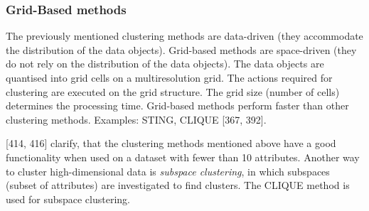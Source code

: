 



 

\subsubsection{Grid-Based methods}
The previously mentioned clustering methods are data-driven (they accommodate the distribution of the data objects). Grid-based methods are space-driven (they do not rely on the distribution of the data objects). The data objects are quantised into grid cells on a multiresolution grid. The actions required for clustering are executed on the grid structure. The grid size (number of cells) determines the processing time. Grid-based methods perform faster than other clustering methods. Examples: STING, CLIQUE \autocite{han2011data}[367, 392].

  

\vspace{5mm} %
\textcite{han2011data}[414, 416] clarify, that the clustering methods mentioned above have a good functionality when used on a dataset with fewer than 10 attributes. Another way to cluster high-dimensional data is \textit{subspace clustering}, in which subspaces (subset of attributes) are investigated to find clusters. The CLIQUE method is used for subspace clustering. 

